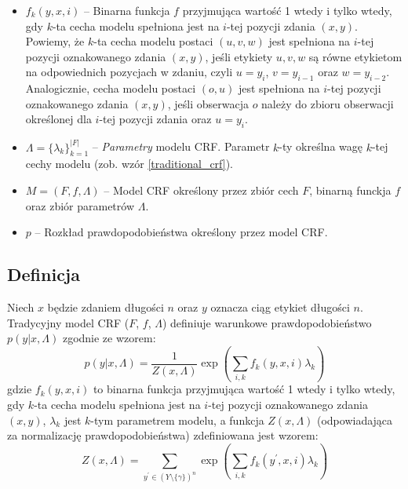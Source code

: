 \documentclass[a4paper,10]{article}
\begin{document}
\begin{itemize}
{po sobie etykiety.}.
Cechy $(u, v, w)$ odpowiadają za modelowanie relacji między sąsiednimi
etykietami, natomiast $(o, u)$ -- za modelowanie relacji między obserwacjami
a etykietami określonymi względem tych samych pozycji w zdaniu.
Postać cech modelu zostanie niecho zmieniona w rozdziale \ref{sec:layers}.
\item $f_k(y, x, i)$ -- Binarna funkcja $f$ przyjmująca wartość 1
wtedy i tylko wtedy, gdy $k$-ta cecha modelu spełniona jest
na $i$-tej pozycji zdania $(x, y)$.
Powiemy, że $k$-ta cecha modelu postaci $(u, v, w)$ jest spełniona na $i$-tej
pozycji oznakowanego zdania $(x, y)$,
jeśli etykiety $u, v, w$ są równe etykietom na odpowiednich pozycjach w zdaniu,
czyli $u = y_i$, $v = y_{i-1}$ oraz $w = y_{i-2}$.
Analogicznie, cecha modelu postaci $(o, u)$ jest spełniona na $i$-tej
pozycji oznakowanego zdania $(x, y)$, jeśli obserwacja $o$ należy do
zbioru obserwacji określonej dla $i$-tej pozycji zdania oraz $u = y_i$.
\item $\Lambda = \lbrace \lambda_k \rbrace_{k=1}^{|F|}$ -- \emph{Parametry}
modelu CRF. Parametr $k$-ty określna wagę $k$-tej cechy modelu
(zob. wzór \ref{traditional_crf}).
\item $M = (F, f, \Lambda)$ -- Model CRF określony przez zbiór cech $F$,
binarną funckja $f$ oraz zbiór parametrów $\Lambda$.
\item $p$ -- Rozkład prawdopodobieństwa określony przez model CRF.
\end{itemize}

\subsection{Definicja}

Niech $x$ będzie zdaniem długości $n$ oraz $y$ oznacza ciąg etykiet
długości $n$.
Tradycyjny model CRF ($F$, $f$, $\Lambda$) definiuje
warunkowe prawdopodobieństwo $p(y \vert x, \Lambda)$
zgodnie ze wzorem:
\begin{equation}\label{traditional_crf}
p(y \vert x, \Lambda) = \frac{1}{Z(x, \Lambda)} \exp 
\left( \sum_{i, k} f_k(y, x, i) \lambda_k \right)
\end{equation}
gdzie $f_k(y, x, i)$ to binarna funkcja przyjmująca wartość 1
wtedy i tylko wtedy, gdy $k$-ta cecha modelu spełniona jest
na $i$-tej pozycji oznakowanego zdania $(x, y)$,
$\lambda_k$ jest $k$-tym parametrem modelu, 
a funkcja $Z(x, \Lambda)$ (odpowiadająca za normalizację prawdopodobieństwa)
zdefiniowana jest wzorem:
\begin{equation}
Z(x, \Lambda) = \sum_{y^\prime \in (Y \setminus \lbrace \gamma \rbrace)^n} \exp
\left( \sum_{i, k} f_k(y^\prime, x, i) \lambda_k \right)
\end{equation}
\end{document}
